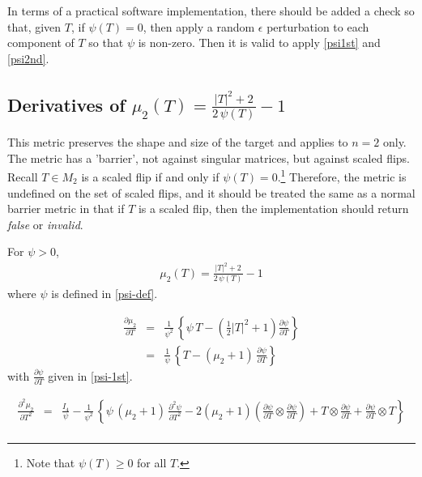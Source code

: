 \documentclass{report}
\begin{document}
\noindent In terms of a practical software implementation, there should be 
added a check so that, given $T$, if $\psi(T) = 0$, then apply
a random $\epsilon$ perturbation to each component of $T$ so that $\psi$ 
is non-zero.  Then it is valid to apply \ref{psi1st} and \ref{psi2nd}. \newline

\subsection{Derivatives of $\mu_2(T)=\frac{|T|^2 + 2}{2 \, \psi(T)}-1$ \label{magic2}}

\noindent This metric preserves the shape and size of the target and applies
to $n=2$ only. The metric has a 'barrier', not against singular matrices,
but against scaled flips. Recall $T \in M_2$ is a scaled flip if and only if 
$\psi(T)=0$.\footnote{Note that $\psi(T) \geq 0$ for all $T$.} Therefore, the metric is undefined on the set of 
scaled flips, and it should be treated the same as a normal barrier metric 
in that if $T$ is a scaled flip, then the implementation should return 
{\it false} or {\it invalid}. \newline

\noindent For $\psi> 0$,
\begin{eqnarray}
\mu_2(T)=\frac{|T|^2 + 2}{2 \, \psi(T)} - 1
\end{eqnarray}
where $\psi$ is defined in \ref{psi-def}. \newline

\begin{eqnarray}
\frac{\partial \mu_2}{\partial T} & = & \frac{1}{\psi^2} \, \left\{ \psi \, T - \left( \frac{1}{2} |T|^2 + 1 \right) \frac{\partial \psi}{\partial T} \right\} \\
& = & \frac{1}{\psi} \, \left\{ T - (\mu_2+1) \,  \frac{\partial \psi}{\partial T} \right\} 
\end{eqnarray}
with $\frac{\partial \psi}{\partial T}$ given in \ref{psi-1st}. \newline

\begin{eqnarray}
\frac{\partial^2 \mu_2}{\partial T^2} & = & \frac{I_4}{\psi} - \frac{1}{\psi^2} \, \left\{ \psi \, (\mu_2+1) \, \frac{\partial^2 \psi}{\partial T^2} - 2 (\mu_2+1) \left( \frac{\partial \psi}{\partial T} \otimes \frac{\partial \psi}{\partial T} \right) + T \otimes \frac{\partial \psi}{\partial T} + \frac{\partial \psi}{\partial T} \otimes T \right\} \nonumber \\
\end{eqnarray}
\end{document}
